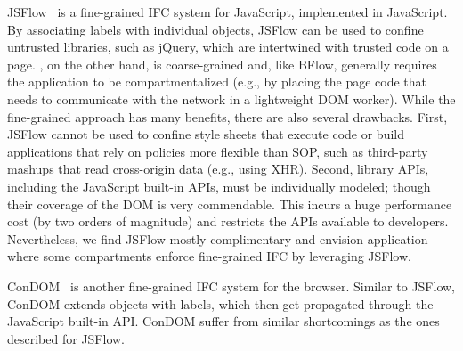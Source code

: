 JSFlow~\cite{JSFlow} is a fine-grained IFC system for JavaScript,
implemented in JavaScript.
%
By associating labels with individual objects, JSFlow can be used to
confine untrusted libraries, such as jQuery, which are intertwined with
trusted code on a page.
%
\sys{}, on the other hand, is coarse-grained and, like BFlow, generally
requires the application to be compartmentalized (e.g., by placing the
page code that needs to communicate with the network in a lightweight
DOM worker).
%
While the fine-grained approach has many benefits, there
are also several drawbacks.
%
First, JSFlow cannot be used to confine style sheets that execute code
or build applications that rely on policies more flexible than SOP,
such as third-party mashups that read cross-origin data (e.g., using
XHR).
%
%
Second, library APIs, including the JavaScript built-in APIs, must be
individually modeled; though their coverage of the DOM is very commendable.
%
This incurs a huge performance cost (by two orders of magnitude)
and restricts the APIs available to developers.
%
Nevertheless, we find JSFlow mostly complimentary and envision
application where some \sys{} compartments enforce fine-grained IFC by
leveraging JSFlow.

ConDOM~\cite{ConDOM} is another fine-grained IFC system for the browser. Similar to
JSFlow, ConDOM extends objects with labels, which then get propagated through
the JavaScript built-in API. ConDOM suffer from similar shortcomings as 
the ones described for JSFlow. 




